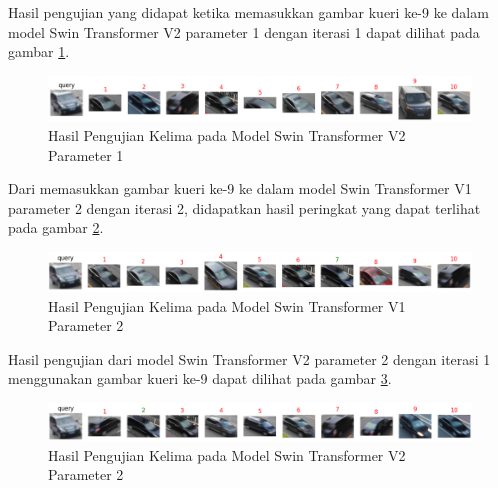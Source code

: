 Hasil pengujian yang didapat ketika memasukkan gambar kueri ke-9 ke dalam model Swin Transformer V2 parameter 1 dengan 
iterasi 1 dapat dilihat pada gambar \ref{fig:hasilpengujiankelimapadamodelswintransformerv2param1}.

\begin{figure}[h!]
  \centering
  \includegraphics[scale=0.6]{gambar/Que9V2P1IT1.png}
  \caption{Hasil Pengujian Kelima pada Model Swin Transformer V2 Parameter 1}
  \label{fig:hasilpengujiankelimapadamodelswintransformerv2param1}
\end{figure}

Dari memasukkan gambar kueri ke-9 ke dalam model Swin Transformer V1 parameter 2 dengan iterasi 2, didapatkan hasil 
peringkat yang dapat terlihat pada gambar \ref{fig:hasilpengujiankelimapadamodelswintransformerv1param2}.

\begin{figure}[h!]
  \centering
  \includegraphics[scale=0.6]{gambar/Que9V1P2IT2.png}
  \caption{Hasil Pengujian Kelima pada Model Swin Transformer V1 Parameter 2}
  \label{fig:hasilpengujiankelimapadamodelswintransformerv1param2}
\end{figure}

Hasil pengujian dari model Swin Transformer V2 parameter 2 dengan iterasi 1 menggunakan gambar kueri ke-9 dapat 
dilihat pada gambar \ref{fig:hasilpengujiankelimapadamodelswintransformerv2param2}.

\begin{figure}[h!]
  \centering
  \includegraphics[scale=0.6]{gambar/Que9V2P2IT1.png}
  \caption{Hasil Pengujian Kelima pada Model Swin Transformer V2 Parameter 2}
  \label{fig:hasilpengujiankelimapadamodelswintransformerv2param2}
\end{figure}

